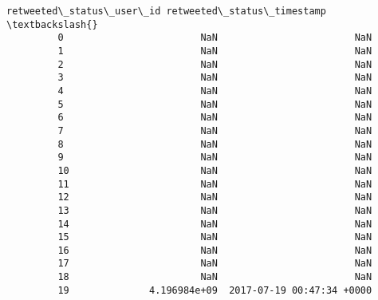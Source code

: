 \documentclass[11pt]{article}
\begin{document}
\begin{Verbatim}[commandchars=\\\{\}]
             retweeted\_status\_user\_id retweeted\_status\_timestamp  \textbackslash{}
         0                        NaN                        NaN   
         1                        NaN                        NaN   
         2                        NaN                        NaN   
         3                        NaN                        NaN   
         4                        NaN                        NaN   
         5                        NaN                        NaN   
         6                        NaN                        NaN   
         7                        NaN                        NaN   
         8                        NaN                        NaN   
         9                        NaN                        NaN   
         10                       NaN                        NaN   
         11                       NaN                        NaN   
         12                       NaN                        NaN   
         13                       NaN                        NaN   
         14                       NaN                        NaN   
         15                       NaN                        NaN   
         16                       NaN                        NaN   
         17                       NaN                        NaN   
         18                       NaN                        NaN   
         19              4.196984e+09  2017-07-19 00:47:34 +0000   
         

\end{Verbatim}
\end{document}
